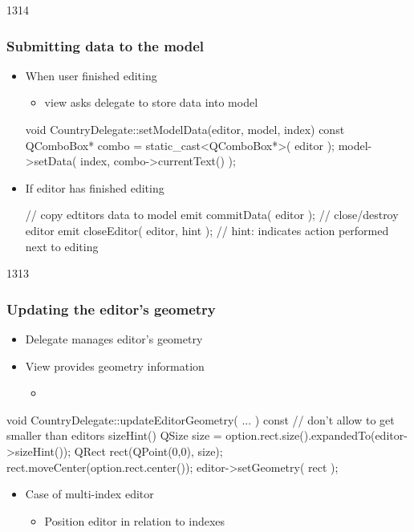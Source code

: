 \begin{slide}[fragile]{1314}
  \frametitle{Submitting data to the model}
  \begin{itemize}
  \item When user finished editing
    \begin{itemize}
    \item view asks delegate to store data into model
    \end{itemize}

  \begin{cpp}
void CountryDelegate::setModelData(editor, model, index) const {
  QComboBox* combo = static_cast<QComboBox*>( editor );
  model->setData( index, combo->currentText() );
}    
  \end{cpp}

\item If editor has finished editing
  \begin{cpp}
// copy edtitors data to model
emit commitData( editor );
// close/destroy editor
emit closeEditor( editor, hint );
// hint: indicates action performed next to editing
 \end{cpp}
\end{itemize}

\end{slide}

\begin{slide}[fragile]{1313}
  \frametitle{Updating the editor's geometry}
  \begin{itemize}
  \item Delegate manages editor's geometry
  \item View provides geometry information
    \begin{itemize}
    \item {}
    \end{itemize}
  \end{itemize}

  \begin{cpp}
void CountryDelegate::updateEditorGeometry( ... ) const {
  // don't allow to get smaller than editors sizeHint()
  QSize size = option.rect.size().expandedTo(editor->sizeHint());
  QRect rect(QPoint(0,0), size); 
  rect.moveCenter(option.rect.center());
  editor->setGeometry( rect );
}    
  \end{cpp}
  \begin{itemize}
  \item Case of multi-index editor
    \begin{itemize}
    \item Position editor in relation to indexes
    \end{itemize}

  \end{itemize}
\end{slide}



